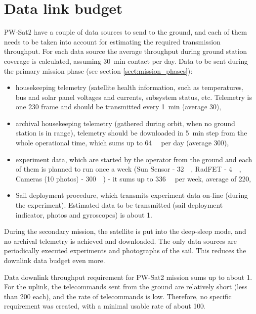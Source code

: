 \section{Data link budget}
PW-Sat2 have a couple of data sources to send to the ground, and each of them needs to be taken into account for estimating the required transmission throughput. For each data source the average throughput during ground station coverage is calculated, assuming \SI{30}{\minute} contact per day.
Data to be sent during the primary mission phase (see section \ref{sect:mission_phases}):
\begin{itemize}
    \item housekeeping telemetry (satellite health information, such as temperatures, bus and solar panel voltages and currents, subsystem status, etc. Telemetry is one \SI{230}{\byte} frame and should be transmitted every \SI{1}{\minute} (average \SI{30}{\bps}),
    \item archival housekeeping telemetry (gathered during orbit, when no ground station is in range), telemetry should be downloaded in \SI{5}{\minute} step from the whole operational time, which sums up to \SI{64}{\kilo\byte} per day (average \SI{300}{\bps}),
    \item experiment data, which are started by the operator from the ground and each of them is planned to run once a week (Sun Sensor -  \SI{32}{\kilo\byte}, RadFET - \SI{4}{\kilo\byte}, Cameras (10 photos) - \SI{300}{\kilo\byte}) - it sums up to \SI{336}{\kilo\byte} per week, average of \SI{220}{\bps},
    \item Sail deployment procedure, which transmits experiment data on-line (during the experiment). Estimated data to be transmitted (sail deployment indicator, photos and gyroscopes) is about \SI{1}{\kbps}.
\end{itemize}
During the secondary mission, the satellite is put into the deep-sleep mode, and no archival telemetry is achieved and downloaded. The only data sources are periodically executed experiments and photographs of the sail. This reduces the downlink data budget even more.

Data downlink throughput requirement for PW-Sat2 mission sums up to about \SI{1}{\kbps}.
For the uplink, the telecommands sent from the ground are relatively short (less than \SI{200}{\byte} each), and the rate of telecommands is low. Therefore, no specific requirement was created, with a minimal usable rate of about \SI{100}{\bps}.

